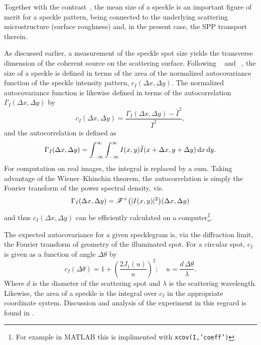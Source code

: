 Together with the contrast~\cite{goodman1975dependence}, the mean size of a
speckle is an important figure of merit for a speckle pattern, being connected
to the underlying scattering microstructure (surface roughness) and, in the
present case, the SPP transport therein.

As discussed earlier, a measurement of the speckle spot
size yields the transverse dimension of the coherent source
on the scattering surface.
Following ~\cite{goodman1975statistical} and
~\cite{dainty1975laser}, the size of a speckle is defined in
terms of the area of the normalized autocovariance function of the speckle
intensity pattern, $c_I(\Delta x, \Delta y)$.  The normalized autocovariance
function is likewise defined in terms of the autocorrelation $\Gamma_I(\Delta
x, \Delta y)$ by
\begin{equation}
c_I(\Delta x, \Delta y) = \frac{\Gamma_I(\Delta x, \Delta y) - \bar{I}^2}{\bar{I}^2},
\label{eqn:normxcov}
\end{equation}
and the autocorrelation is defined as
\begin{equation}
\Gamma_I(\Delta x, \Delta y) = \int_{-\infty}^{\infty}\int_{-\infty}^{\infty} I(x,y) \tilde{I}(x+\Delta x,y+\Delta y) \,\mathrm{d} x \,\mathrm{d} y.
\end{equation}
For computation on real images, the integral is replaced by a sum.  Taking
advantage of the Wiener–Khinchin theorem, the autocorrelation is simply the
Fourier transform of the power spectral density, vis.
\begin{equation}
\Gamma_I(\Delta x, \Delta y) = {\mathscr{F}^{+}\bigl(|I(x,y)|^2\bigr)}(\Delta x, \Delta y)
\end{equation}
and thus  $c_I(\Delta x, \Delta y)$ can be efficiently calculated on a
computer\footnote{For example in MATLAB this is implimented with
\texttt{xcov(I,'coeff')}}.

The expected autocovariance for a given specklegram is, via the diffraction
limit, the Fourier transform of geometry of the illuminated spot.  For a
circular spot, $c_I$ is given as a function of angle $\Delta \theta$ by
\begin{equation}
c_I\left(\Delta \theta\right) = 1 + \left(\frac{2 J_1(u)}{u}\right)^2;\quad
u=\frac{d\, \Delta\theta}{\lambda}.
\label{eqn:angularsize}
\end{equation}
Where $d$ is the diameter of the scattering spot and $\lambda$ is the
scattering wavelength.  Likewise, the area of a speckle is the integral over
$c_I$ in the appropriate coordinate system.  Discussion and analysis of the
experiment in this regrard is found in .

